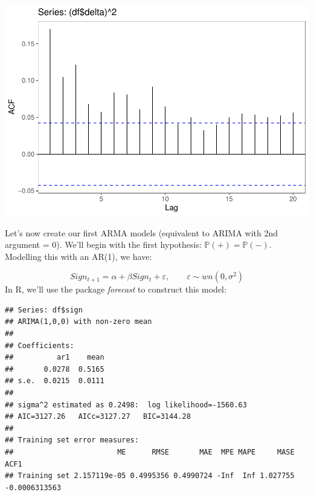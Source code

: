 \documentclass[11pt, a4paper]{report}
\newenvironment{Shaded}{\begin{snugshade}}{\end{snugshade}}
\newcommand{\DataTypeTok}[1]{\textcolor[rgb]{0.13,0.29,0.53}{#1}}
\newcommand{\DecValTok}[1]{\textcolor[rgb]{0.00,0.00,0.81}{#1}}
\newcommand{\KeywordTok}[1]{\textcolor[rgb]{0.13,0.29,0.53}{\textbf{#1}}}
\newcommand{\NormalTok}[1]{#1}
\newcommand{\OperatorTok}[1]{\textcolor[rgb]{0.81,0.36,0.00}{\textbf{#1}}}
\newcommand{\StringTok}[1]{\textcolor[rgb]{0.31,0.60,0.02}{#1}}
\theoremstyle{plain}
\theoremstyle{plain}
\theoremstyle{remark}
\begin{document}
\begin{center}\includegraphics{Econo2_P1_files/figure-latex/plots-9} \end{center}

Let's now create our first ARMA models (equivalent to ARIMA with 2nd
argument = 0). We'll begin with the first hypothesis:
\(\mathbb{P}(+) = \mathbb{P}(-).\) Modelling this with an AR(1), we
have:

\[Sign_{t+1} = \alpha + \beta Sign_t + \varepsilon, \hspace{2em} \varepsilon \sim wn(0, \sigma^2)\]
In R, we'll use the package \emph{forecast} to construct this model:

\begin{Shaded}
\end{Shaded}

\begin{verbatim}
## Series: df$sign 
## ARIMA(1,0,0) with non-zero mean 
## 
## Coefficients:
##          ar1    mean
##       0.0278  0.5165
## s.e.  0.0215  0.0111
## 
## sigma^2 estimated as 0.2498:  log likelihood=-1560.63
## AIC=3127.26   AICc=3127.27   BIC=3144.28
## 
## Training set error measures:
##                        ME      RMSE       MAE  MPE MAPE     MASE          ACF1
## Training set 2.157119e-05 0.4995356 0.4990724 -Inf  Inf 1.027755 -0.0006313563
\end{verbatim}
\end{document}
